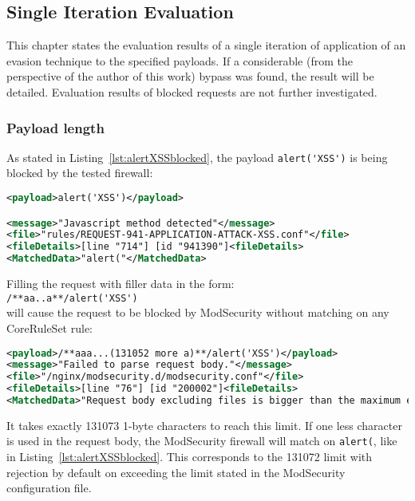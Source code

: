\subsection{Single Iteration Evaluation}
\label{sec:singleiterationeva}
This chapter states the evaluation results of a single iteration of application of an evasion technique to the specified payloads. If a considerable (from the perspective of the author of this work) bypass was found, the result will be detailed. Evaluation results of blocked requests are not further investigated.


\subsubsection{Payload length}
\label{sec:paylensingleiter}
As stated in Listing~\ref{lst:alertXSSblocked}, the payload \verb|alert('XSS')| is being blocked by the tested firewall:

\begin{lstlisting}[style=ruleStyle, language=XML, caption=alert('XSS'), label={lst:alertXSSblocked}]
<payload>alert('XSS')</payload>

<message>"Javascript method detected"</message>
<file>"rules/REQUEST-941-APPLICATION-ATTACK-XSS.conf"</file>
<fileDetails>[line "714"] [id "941390"]<fileDetails>
<MatchedData>"alert("</MatchedData>
\end{lstlisting}

Filling the request with filler data in the form: \\
\verb|/**aa..a**/alert('XSS')| \\
will cause the request to be blocked by ModSecurity without matching on any CoreRuleSet rule:

\begin{lstlisting}[style=ruleStyle, language=XML, caption=request body bigger than maximum, label={lst:requesttoobig}]
<payload>/**aaa...(131052 more a)**/alert('XSS')</payload>
<message>"Failed to parse request body."</message>
<file>"/nginx/modsecurity.d/modsecurity.conf"</file>
<fileDetails>[line "76"] [id "200002"]<fileDetails>
<MatchedData>"Request body excluding files is bigger than the maximum expected."</MatchedData>
\end{lstlisting}

It takes exactly 131073 1-byte characters to reach this limit. If one less character is used in the request body, the ModSecurity firewall will match on \verb|alert(|, like in Listing~\ref{lst:alertXSSblocked}. This corresponds to the 131072 limit with rejection by default on exceeding the limit stated in the ModSecurity configuration file.


